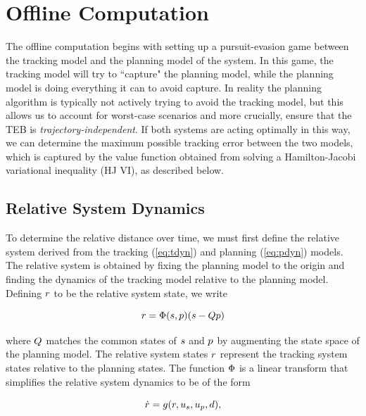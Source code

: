 \section{Offline Computation \label{sec:precomp}}
The offline computation begins with setting up a pursuit-evasion game \cite{Huang11, Chen17} between the tracking model and the planning model of the system. 
In this game, the tracking model will try to ``capture" the planning model, while the planning model is doing everything it can to avoid capture. 
In reality the planning algorithm is typically not actively trying to avoid the tracking model, but this allows us to account for worst-case scenarios and more crucially, ensure that the TEB is \textit{trajectory-independent}. 
If both systems are acting optimally in this way, we can determine the %
maximum possible tracking error between the two models, which is captured by the value function obtained from solving a Hamilton-Jacobi variational inequality (HJ VI), as described below.

\subsection{Relative System Dynamics}
To determine the relative distance over time, we must first define the relative system derived from the tracking (\ref{eq:tdyn}) and planning (\ref{eq:pdyn}) models. 
The relative system is obtained by fixing the planning model to the origin and finding the dynamics of the tracking model relative to the planning model.
Defining $r$ to be the relative system state, we write

\begin{equation}
\label{eq:rstate}
\rstate = \rtrans(\tstate,\pstate)(\tstate - \ptmat\pstate)
\end{equation}

\noindent where $Q$ matches the common states of $s$ and $p$ by augmenting the state space of the planning model.
The relative system states $r$ represent the tracking system states relative to the planning states.
The function $\Phi$ is a linear transform that simplifies the relative system dynamics to be of the form

\begin{equation}
\label{eq:rdyn}
\dot\rstate = \rdyn(\rstate, \tctrl, \pctrl, \dstb),
\end{equation}

